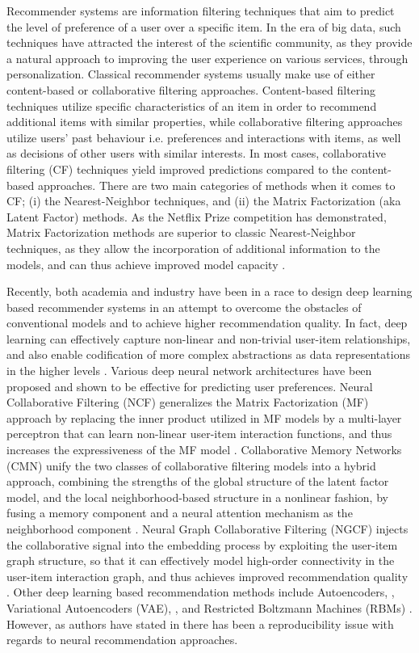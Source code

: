 Recommender systems are information filtering techniques that aim to predict the level of preference of a user over a specific item. 
In the era of big data, such techniques have attracted the interest of the scientific community, as they provide a natural approach to improving the user experience on various services, through personalization.
Classical recommender systems usually make use of either content-based or collaborative filtering approaches. 
Content-based filtering techniques utilize specific characteristics of an item in order to recommend additional items with similar properties, while collaborative filtering approaches utilize users' past behaviour i.e. preferences and interactions with items, as well as decisions of other users with similar interests. 
In most cases, collaborative filtering (CF) techniques yield improved predictions compared to the content-based approaches.
There are two main categories of methods when it comes to CF; (i) the Nearest-Neighbor techniques, and (ii) the Matrix Factorization (aka Latent Factor) methods.
As the Netflix Prize competition has demonstrated, Matrix Factorization methods are superior to classic Nearest-Neighbor techniques, as they allow the incorporation of additional information to the models, and can thus achieve improved model capacity \cite{koren2009matrix}.

Recently, both academia and industry have been in a race to design deep learning based recommender systems in an attempt to overcome the obstacles of conventional models and to achieve higher recommendation quality. 
In fact, deep learning can effectively capture non-linear and non-trivial user-item relationships, and also enable codification of more complex abstractions as data representations in the higher levels \cite{zhang2019deep}.
Various deep neural network architectures have been proposed and shown to be effective for predicting user preferences. 
Neural Collaborative Filtering (NCF) generalizes the Matrix Factorization (MF) approach by replacing the inner product utilized in MF models by a multi-layer perceptron that can learn non-linear user-item interaction functions, and thus increases the expressiveness of the MF model \cite{he2017neural}. 
Collaborative Memory Networks (CMN) unify the two classes of collaborative filtering models into a hybrid approach, combining the strengths of the global structure of the latent factor model, and the local neighborhood-based structure in a nonlinear fashion, by fusing a memory component and a neural attention mechanism as the neighborhood component \cite{ebesu2018collaborative}. 
Neural Graph Collaborative Filtering (NGCF) injects the collaborative signal into the embedding process by exploiting the user-item graph structure, so that it can effectively model high-order connectivity in the user-item interaction graph, and thus achieves improved recommendation quality \cite{wang2019neural}. 
Other deep learning based recommendation methods include Autoencoders, \cite{sedhain2015autorec}, Variational Autoencoders (VAE), \cite{liang2018variational}, and Restricted Boltzmann Machines (RBMs) \cite{salakhutdinov2007restricted}. 
However, as authors have stated in \cite{dacrema2019we} there has been a reproducibility issue with regards to neural recommendation approaches. 

